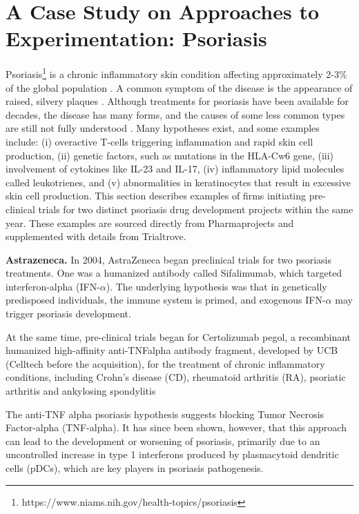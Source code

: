 \section{A Case Study on Approaches to Experimentation: Psoriasis}\label{app:case-study}

Psoriasis\footnote{https://www.niams.nih.gov/health-topics/psoriasis} is a chronic inflammatory skin condition affecting approximately 2-3\% of the global population \citep{Ayala-Fontanez}. A common symptom of the disease is the appearance of raised, silvery plaques \citep{Nestle-psoriasis}. Although treatments for psoriasis have been available for decades, the disease has many forms, and the causes of some less common types are still not fully understood \citep{guo2023signaling}. Many hypotheses exist, and some examples include: (i) overactive T-cells triggering inflammation and rapid skin cell production, (ii) genetic factors, such as mutations in the HLA-Cw6 gene, (iii) involvement of cytokines like IL-23 and IL-17, (iv) inflammatory lipid molecules called leukotrienes, and (v) abnormalities in keratinocytes that result in excessive skin cell production. This section describes examples of firms initiating pre-clinical trials for two distinct psoriasis drug development projects within the same year. These examples are sourced directly from Pharmaprojects and supplemented with details from Trialtrove.


\textbf{Astrazeneca.} In 2004, AstraZeneca began preclinical trials for two psoriasis treatments. One was a humanized antibody called Sifalimumab, which targeted interferon-alpha (IFN-$\alpha$). The underlying hypothesis was that in genetically predisposed individuals, the immune system is primed, and exogenous IFN-$\alpha$ may trigger psoriasis development.

At the same time, pre-clinical trials began for Certolizumab pegol, a recombinant humanized high-affinity anti-TNFalpha antibody fragment, developed by UCB (Celltech before the acquisition), for the treatment of chronic inflammatory conditions, including Crohn's disease (CD), rheumatoid arthritis (RA), psoriatic arthritis and ankylosing spondylitis 

The anti-TNF alpha psoriasis hypothesis suggests blocking Tumor Necrosis Factor-alpha (TNF-alpha). It has since been shown, however, that this approach can lead to the development or worsening of psoriasis, primarily due to an uncontrolled increase in type 1 interferons produced by plasmacytoid dendritic cells (pDCs), which are key players in psoriasis pathogenesis. 


